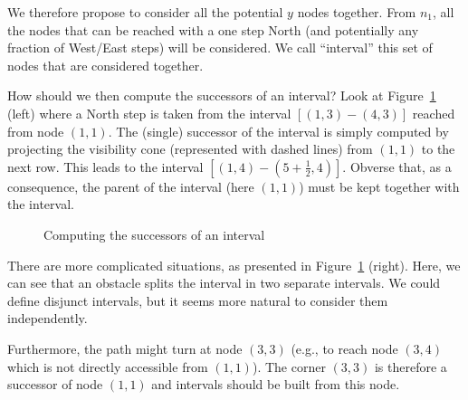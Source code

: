 We therefore propose to consider all the potential $y$ nodes together.  
From $n_1$, all the nodes that can be reached with a one step North 
(and potentially any fraction of West/East steps) will be considered.  
We call ``interval'' this set of nodes that are considered together.  

How should we then compute the successors of an interval?  
Look at Figure~\ref{fig::succ1} (left) 
where a North step is taken from the interval $[(1,3)-(4,3)]$
reached from node $(1,1)$.  
The (single) successor of the interval 
is simply computed by projecting the visibility cone 
(represented with dashed lines)
from $(1,1)$ to the next row.  
This leads to the interval $[(1,4)-(5+\frac{1}{2},4)]$.  
Obverse that, as a consequence, the parent of the interval 
(here $(1,1)$) must be kept together with the interval.  

\begin{figure}[ht]
  \begin{minipage}{0.5\linewidth}
  \begin{center}
    
  \end{center}
  \end{minipage}
  \begin{minipage}{0.5\linewidth}
  \begin{center}
    
  \end{center}
  \end{minipage}
  \caption{Computing the successors of an interval}
  \label{fig::succ1}
\end{figure}

There are more complicated situations, 
as presented in Figure~\ref{fig::succ1} (right).  
Here, we can see that an obstacle splits the interval 
in two separate intervals.  
We could define disjunct intervals, 
but it seems more natural to consider them independently.  

Furthermore, the path might turn at node $(3,3)$
(e.g., to reach node $(3,4)$
which is not directly accessible from $(1,1)$).  
The corner $(3,3)$ is therefore a successor of node $(1,1)$ 
and intervals should be built from this node.  

